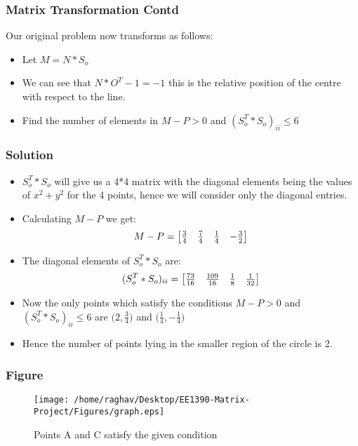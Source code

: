\documentclass{beamer}
\begin{document}
\begin{frame}
\frametitle{Matrix Transformation Contd}
Our original problem now transforms as follows:
\begin{itemize}
 \item<1-> Let $M = N*S_o$ 
 \item<2-> We can see that $N*O^{T} - 1 = -1$ this is the relative position of the centre with respect to the line.
 \item<3-> Find the number of elements in $M-P > 0$ and $(S_o^{T}*S_o)_{ii}\leqslant 6$
\end{itemize}

\end{frame}

\begin{frame}
\frametitle{Solution}
\begin{itemize}
 \item<1-> $S_o^{T}*S_o$ will give us a 4*4 matrix with the diagonal elements being the values of $x^{2} + y^{2}$ for the 4 points, hence we will consider only the diagonal entries. 
 \item<2-> Calculating $M-P$ we get:
 \[
 M-P =
\begin{bmatrix}
    $\(\frac{3}{4}\)$ & $\(\frac{7}{4}\)$ & $\(\frac{1}{4}\)$ & $\(-\frac{3}{2}\)$
\end{bmatrix}
\] 
 \item<3-> The diagonal elements of $S_o^{T}*S_o$ are:
  \[
 (S_o^{T}*S_o)_{ii} =
\begin{bmatrix}
    $\(\frac{73}{16}\)$ & $\(\frac{109}{16}\)$ & $\(\frac{1}{8}\)$ & $\(\frac{1}{32}\)$
\end{bmatrix}
\] 
\item<4-> Now the only points which satisfy the conditions $M-P > 0$ and $(S_o^{T}*S_o)_{ii}\leqslant 6$ are $\bigg(2,$\(\frac{3}{4}\)$\bigg)$ and $\bigg($\(\frac{1}{4}\)$,$\(-\frac{1}{4}\)$\bigg)$
\item<5->Hence the number of points lying in the smaller region of the circle is 2.
\end{itemize}

\end{frame}

\begin{frame}
\frametitle{Figure}
\begin{figure}[h]
\centering
\texttt{[image: /home/raghav/Desktop/EE1390-Matrix-Project/Figures/graph.eps]}
\caption{Points A and C satisfy the given condition}
\label{foobar-figure}
\end{figure}

\end{frame}
\end{document}

